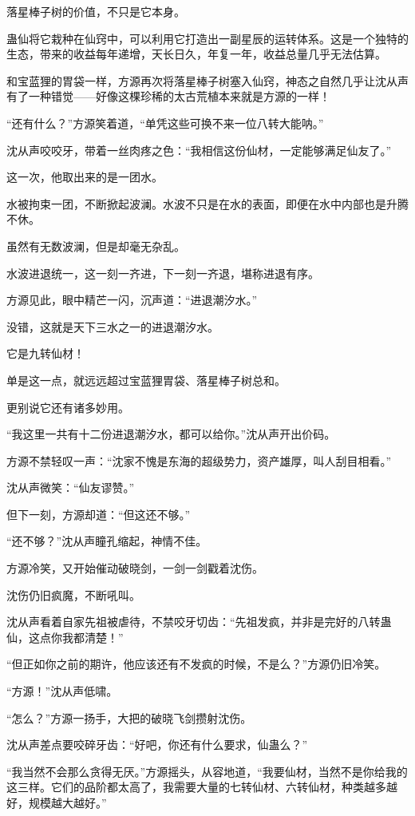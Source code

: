 \begin{this_body}
落星棒子树的价值，不只是它本身。

蛊仙将它栽种在仙窍中，可以利用它打造出一副星辰的运转体系。这是一个独特的生态，带来的收益每年递增，天长日久，年复一年，收益总量几乎无法估算。

和宝蓝狸的胃袋一样，方源再次将落星棒子树塞入仙窍，神态之自然几乎让沈从声有了一种错觉——好像这棵珍稀的太古荒植本来就是方源的一样！

“还有什么？”方源笑着道，“单凭这些可换不来一位八转大能呐。”

沈从声咬咬牙，带着一丝肉疼之色：“我相信这份仙材，一定能够满足仙友了。”

这一次，他取出来的是一团水。

水被拘束一团，不断掀起波澜。水波不只是在水的表面，即便在水中内部也是升腾不休。

虽然有无数波澜，但是却毫无杂乱。

水波进退统一，这一刻一齐进，下一刻一齐退，堪称进退有序。

方源见此，眼中精芒一闪，沉声道：“进退潮汐水。”

没错，这就是天下三水之一的进退潮汐水。

它是九转仙材！

单是这一点，就远远超过宝蓝狸胃袋、落星棒子树总和。

更别说它还有诸多妙用。

“我这里一共有十二份进退潮汐水，都可以给你。”沈从声开出价码。

方源不禁轻叹一声：“沈家不愧是东海的超级势力，资产雄厚，叫人刮目相看。”

沈从声微笑：“仙友谬赞。”

但下一刻，方源却道：“但这还不够。”

“还不够？”沈从声瞳孔缩起，神情不佳。

方源冷笑，又开始催动破晓剑，一剑一剑戳着沈伤。

沈伤仍旧疯魔，不断吼叫。

沈从声看着自家先祖被虐待，不禁咬牙切齿：“先祖发疯，并非是完好的八转蛊仙，这点你我都清楚！”

“但正如你之前的期许，他应该还有不发疯的时候，不是么？”方源仍旧冷笑。

“方源！”沈从声低啸。

“怎么？”方源一扬手，大把的破晓飞剑攒射沈伤。

沈从声差点要咬碎牙齿：“好吧，你还有什么要求，仙蛊么？”

“我当然不会那么贪得无厌。”方源摇头，从容地道，“我要仙材，当然不是你给我的这三样。它们的品阶都太高了，我需要大量的七转仙材、六转仙材，种类越多越好，规模越大越好。”


\end{this_body}
